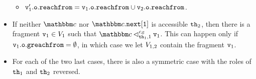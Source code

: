 \begin{itemize}
\begin{itemize}
  \item $\mathtt{v}_1'.\mathtt{o}.\mathtt{reachfrom} = \mathtt{v}_{1}.\mathtt{o}.\mathtt{reachfrom} \cup \mathtt{v}_{2}.\mathtt{o}.\mathtt{reachfrom}$.
    \end{itemize}
\item
  If neither $\cell$ nor
  $\cell.{\tt next[1]}$  is accessible  ${\tt th}_2$, then
  there is a  fragment $\mathtt{v}_1 \in V_1$
  such that $\cell \lsatfrag{1}{\thread_1}{\sconf} \frag_1$.
  This can happen only if
  $\mathtt{v}_1.\mathtt{o}.\mathtt{greachfrom} = \emptyset$,
  in which case we let  $V_{1,2}$ contain the fragment
  $\mathtt{v}_1$.
\item
  For each of the two last cases, there is also a symmetric case with the
  roles of ${\tt th}_1$ and ${\tt th}_2$ reversed.
\end{itemize}



